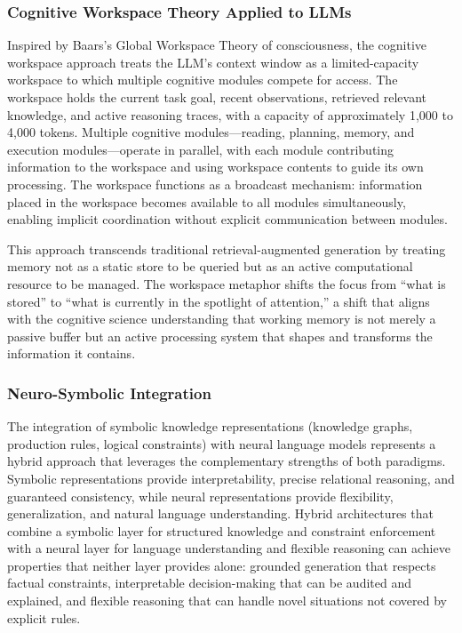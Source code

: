 \documentclass[11pt,letterpaper]{article}
\begin{document}
\subsubsection{Cognitive Workspace Theory Applied to LLMs}

Inspired by Baars's Global Workspace Theory of consciousness, the cognitive workspace approach treats the LLM's context window as a limited-capacity workspace to which multiple cognitive modules compete for access. The workspace holds the current task goal, recent observations, retrieved relevant knowledge, and active reasoning traces, with a capacity of approximately 1,000 to 4,000 tokens. Multiple cognitive modules---reading, planning, memory, and execution modules---operate in parallel, with each module contributing information to the workspace and using workspace contents to guide its own processing. The workspace functions as a broadcast mechanism: information placed in the workspace becomes available to all modules simultaneously, enabling implicit coordination without explicit communication between modules.

This approach transcends traditional retrieval-augmented generation by treating memory not as a static store to be queried but as an active computational resource to be managed. The workspace metaphor shifts the focus from ``what is stored'' to ``what is currently in the spotlight of attention,'' a shift that aligns with the cognitive science understanding that working memory is not merely a passive buffer but an active processing system that shapes and transforms the information it contains.

\subsubsection{Neuro-Symbolic Integration}

The integration of symbolic knowledge representations (knowledge graphs, production rules, logical constraints) with neural language models represents a hybrid approach that leverages the complementary strengths of both paradigms. Symbolic representations provide interpretability, precise relational reasoning, and guaranteed consistency, while neural representations provide flexibility, generalization, and natural language understanding. Hybrid architectures that combine a symbolic layer for structured knowledge and constraint enforcement with a neural layer for language understanding and flexible reasoning can achieve properties that neither layer provides alone: grounded generation that respects factual constraints, interpretable decision-making that can be audited and explained, and flexible reasoning that can handle novel situations not covered by explicit rules.
\end{document}
